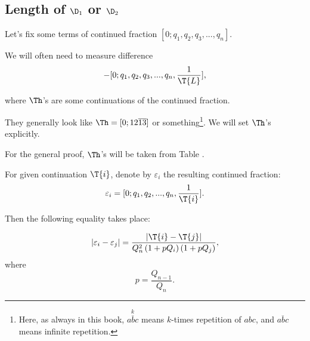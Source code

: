 \subsection{Length of $\D_1$ or $\D_2$}

Let's fix some terms of continued fraction $[0; q_1, q_2, q_3, ..., q_n]$.

We will often need to measure difference
\begin{equation*}
	[0; q_1, q_2, q_3, ..., q_n, \frac{1}{\T{R}}] - 
	[0; q_1, q_2, q_3, ..., q_n, \frac{1}{\T{L}}],
\end{equation*}

where $\Th$'s are some continuations of the continued fraction.

They generally look like $\Th = [0;12\overline{13}]$ or something\footnote{%
	Here, as always in this book, $\overset{k}{\overline{abc}}$
	means $k$-times repetition of $abc$,
	and $\overline{abc}$ means infinite repetition.}.
We will set $\Th$'s explicitly.

For the general proof, $\Th$'s will be taken from Table .

\begin{designation}
	For given continuation $\T{i}$, denote by $\varepsilon_i$ the resulting continued fraction:
	\begin{equation}\label{eq:epsilon-rule}
		\varepsilon_i = [0; q_1, q_2, ..., q_n, \frac{1}{\T{i}}].
	\end{equation}
\end{designation}

Then the following equality takes place:

\begin{equation}\label{varepsilons_difference}
	| \varepsilon_i - \varepsilon_j | = 
	\dfrac{| \T{i} - \T{j} |}
	{Q_n^2 \left(1 + pQ_i\right) \left(1 + pQ_j\right)},
\end{equation}
%
where
%
\begin{equation*}
	p = \dfrac{Q_{n-1}}{Q_n}.
\end{equation*}
